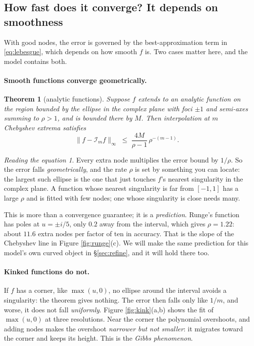 \documentclass[10pt,a4paper]{article}
\theoremstyle{plain}
\newtheorem{thm}{Theorem}[section]
\theoremstyle{remark}
\newtheorem*{reading}{Reading the equation}
\begin{document}
\subsection{How fast does it converge? It depends on smoothness}

With good nodes, the error is governed by the best-approximation term in \eqref{eq:lebesgue},
which depends on how smooth $f$ is. Two cases matter here, and the model contains both.

\paragraph{Smooth functions converge geometrically.}

\begin{thm}[analytic functions]
\label{thm:geom}
Suppose $f$ extends to an analytic function on the region bounded by the ellipse in the
complex plane with foci $\pm1$ and semi-axes summing to $\rho>1$, and is bounded there by $M$.
Then interpolation at $m$ Chebyshev extrema satisfies
\begin{equation}
  \|f-\mathcal{I}_m f\|_\infty \;\le\; \frac{4M}{\rho-1}\,\rho^{-(m-1)}.
  \label{eq:geom}
\end{equation}
\end{thm}

\begin{reading}
Every extra node multiplies the error bound by $1/\rho$. So the error falls
\emph{geometrically}, and the rate $\rho$ is set by something you can locate: the largest
such ellipse is the one that just touches $f$'s nearest singularity in the complex plane. A
function whose nearest singularity is far from $[-1,1]$ has a large $\rho$ and is fitted with
few nodes; one whose singularity is close needs many.
\end{reading}

\noindent This is more than a convergence guarantee; it is a \emph{prediction}. Runge's
function has poles at $u=\pm i/5$, only $0.2$ away from the interval, which gives
$\rho = 1.22$: about $11.6$ extra nodes per factor of ten in accuracy. That is the slope of
the Chebyshev line in Figure \ref{fig:runge}(c). We will make the same prediction for this
model's own curved object in \S\ref{sec:refine}, and it will hold there too.

\paragraph{Kinked functions do not.} If $f$ has a corner, like $\max(u,0)$, no ellipse
around the interval avoids a singularity: the theorem gives nothing. The error then falls
only like $1/m$, and worse, it does not fall \emph{uniformly}. Figure \ref{fig:kink}(a,b)
shows the fit of $\max(u,0)$ at three resolutions. Near the corner the polynomial overshoots,
and adding nodes makes the overshoot \emph{narrower but not smaller}: it migrates toward the
corner and keeps its height. This is the \emph{Gibbs phenomenon}.
\end{document}
